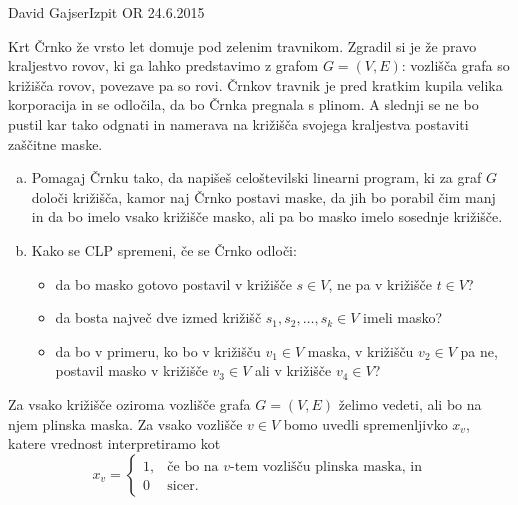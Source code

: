 \begin{naloga}{David Gajser}{Izpit OR 24.6.2015}
\begin{vprasanje}
Krt Črnko že vrsto let domuje pod zelenim travnikom.
Zgradil si je že pravo kraljestvo rovov,
ki ga lahko predstavimo z grafom $G = (V, E)$:
vozlišča grafa so križišča rovov, povezave pa so rovi.
Črnkov travnik je pred kratkim kupila velika korporacija in se odločila,
da bo Črnka pregnala s plinom.
A slednji se ne bo pustil kar tako odgnati
in namerava na križišča svojega kraljestva postaviti zaščitne maske.

\begin{enumerate}[(a)]
\item Pomagaj Črnku tako, da napišeš celoštevilski linearni program,
ki za graf $G$ določi križišča, kamor naj Črnko postavi maske,
da jih bo porabil čim manj in da bo imelo vsako križišče masko,
ali pa bo masko imelo sosednje križišče.

\item Kako se CLP spremeni, če se Črnko odloči:
    \begin{itemize}
    \item da bo masko gotovo postavil v križišče $s \in V$,
    ne pa v križišče $t \in V$?
    \item da bosta največ dve izmed križišč $s_1, s_2, \dots, s_k \in V$
    imeli masko?
    \item da bo v primeru, ko bo v križišču $v_1 \in V$ maska,
    v križišču $v_2 \in V$ pa ne,
    postavil masko v križišče $v_3 \in V$ ali v križišče $v_4 \in V$?
    \end{itemize}
\end{enumerate}
\end{vprasanje}

\begin{odgovor}
Za vsako križišče oziroma vozlišče grafa $G = (V, E)$ želimo vedeti, ali bo na njem plinska maska.
Za vsako vozlišče $v \in V$ bomo uvedli spremenljivko $x_{v}$,
katere vrednost interpretiramo kot
$$
x_{v} = \begin{cases}
1, & \text{če bo na $v$-tem vozlišču plinska maska, in} \\
0  & \text{sicer.}
\end{cases}
$$


\end{odgovor}
\end{naloga}
